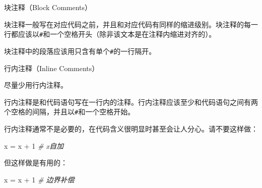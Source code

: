 \documentclass[ignorenonframetext,9pt]{beamer}
\newenvironment{Shaded}{}{}
\newcommand{\CommentTok}[1]{\textcolor[rgb]{0.38,0.63,0.69}{\textit{#1}}}
\newcommand{\DecValTok}[1]{\textcolor[rgb]{0.25,0.63,0.44}{#1}}
\newcommand{\NormalTok}[1]{#1}
\newcommand{\OperatorTok}[1]{\textcolor[rgb]{0.40,0.40,0.40}{#1}}
\begin{document}
\begin{frame}[fragile]

\begin{block}{块注释（Block Comments）}

块注释一般写在对应代码之前，并且和对应代码有同样的缩进级别。块注释的每一行都应该以\texttt{\#}和一个空格开头（除非该文本是在注释内缩进对齐的）。

块注释中的段落应该用只含有单个\texttt{\#}的一行隔开。

\end{block}

\begin{block}{行内注释（Inline Comments）}

尽量少用行内注释。

行内注释是和代码语句写在一行内的注释。行内注释应该至少和代码语句之间有两个空格的间隔，并且以\texttt{\#}和一个空格开始。

行内注释通常不是必要的，在代码含义很明显时甚至会让人分心。请不要这样做：

\begin{Shaded}
\begin{Highlighting}[]
\NormalTok{x }\OperatorTok{=}\NormalTok{ x }\OperatorTok{+} \DecValTok{1}                 \CommentTok{# x自加}
\end{Highlighting}
\end{Shaded}

但这样做是有用的：

\begin{Shaded}
\begin{Highlighting}[]
\NormalTok{x }\OperatorTok{=}\NormalTok{ x }\OperatorTok{+} \DecValTok{1}                 \CommentTok{# 边界补偿}
\end{Highlighting}
\end{Shaded}

\end{block}

\end{frame}
\end{document}
